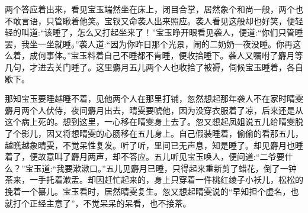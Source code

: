 \begin{parag}
    两个答应着出来，看见宝玉端然坐在床上，闭目合掌，居然象个和尚一般，两个也不敢言语，只管瞅着他笑。宝钗又命袭人出来照应。袭人看见这般却也好笑，便轻轻的叫道:“该睡了，怎么又打起坐来了！”宝玉睁开眼看见袭人，便道:“你们只管睡罢，我坐一坐就睡。”袭人道:“因为你昨日那个光景，闹的二奶奶一夜没睡。你再这么着，成何事体。”宝玉料着自己不睡都不肯睡，便收拾睡下。袭人又嘱咐了麝月等几句，才进去关门睡了。这里麝月五儿两个人也收拾了被褥，伺候宝玉睡着，各自歇下。
\end{parag}


\begin{parag}
    那知宝玉要睡越睡不着，见他两个人在那里打铺，忽然想起那年袭人不在家时晴雯麝月两个人伏侍，夜间麝月出去，晴雯要唬他，因为没穿衣服着了凉，后来还是从这个病上死的。想到这里，一心移在晴雯身上去了。忽又想起凤姐说五儿给晴雯脱了个影儿，因又将想晴雯的心肠移在五儿身上。自己假装睡着，偷偷的看那五儿，越瞧越象晴雯，不觉呆性复发。听了听，里间已无声息，知是睡了。却见麝月也睡着了，便故意叫了麝月两声，却不答应。五儿听见宝玉唤人，便问道:“二爷要什么？”宝玉道:“我要漱漱口。”五儿见麝月已睡，只得起来重新剪了蜡花，倒了一钟茶来，一手托着漱盂。却因赶忙起来的，身上只穿着一件桃红绫子小袄儿，松松的挽着一个纂儿。宝玉看时，居然晴雯复生。忽又想起晴雯说的“早知担个虚名，也就打个正经主意了”，不觉呆呆的呆看，也不接茶。
\end{parag}


